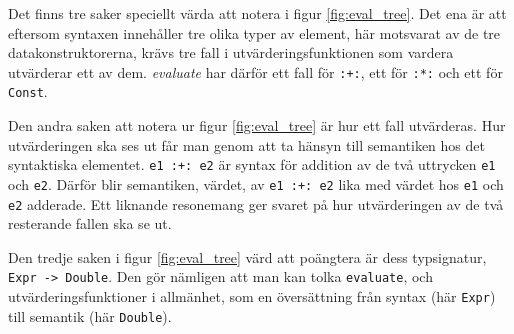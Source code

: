 \begin{draft}
Det finns tre saker speciellt värda att notera i figur \ref{fig:eval_tree}. Det ena är att eftersom syntaxen innehåller tre olika typer av element, här motsvarat av de tre datakonstruktorerna, krävs tre fall i utvärderingsfunktionen som vardera utvärderar ett av dem. \textit{evaluate} har därför ett fall för \texttt{:+:}, ett för \texttt{:*:} och ett för \texttt{Const}. 

Den andra saken att notera ur figur \ref{fig:eval_tree} är hur ett fall utvärderas. Hur utvärderingen ska ses ut får man genom att ta hänsyn till semantiken hos det syntaktiska elementet. \texttt{e1 :+: e2} är syntax för addition av de två uttrycken \texttt{e1} och \texttt{e2}. Därför blir semantiken, värdet, av \texttt{e1 :+: e2} lika med värdet hos \texttt{e1} och \texttt{e2} adderade. Ett liknande resonemang ger svaret på hur utvärderingen av de två resterande fallen ska se ut.

Den tredje saken i figur \ref{fig:eval_tree} värd att poängtera är dess typsignatur, \texttt{Expr -> Double}. Den gör nämligen att man kan tolka \texttt{evaluate}, och utvärderingsfunktioner i allmänhet, som en översättning från syntax (här \texttt{Expr}) till semantik (här \texttt{Double}).

\end{draft}


